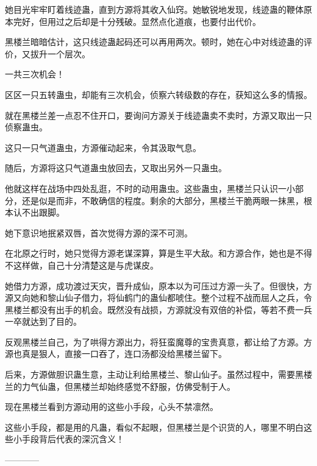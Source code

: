 \begin{this_body}
她目光牢牢盯着线迹蛊，直到方源将其收入仙窍。她敏锐地发现，线迹蛊的鞭体原本完好，但用过之后却是十分残破。显然点化道痕，也要付出代价。

黑楼兰暗暗估计，这只线迹蛊起码还可以再用两次。顿时，她在心中对线迹蛊的评价，又拔升一个层次。

一共三次机会！

区区一只五转蛊虫，却能有三次机会，侦察六转级数的存在，获知这么多的情报。

就在黑楼兰差一点忍不住开口，要询问方源关于线迹蛊卖不卖时，方源又取出一只侦察蛊虫。

这只一只气道蛊虫，方源催动起来，令其汲取气息。

随后，方源将这只气道蛊虫放回去，又取出另外一只蛊虫。

他就这样在战场中四处乱逛，不时的动用蛊虫。这些蛊虫，黑楼兰只认识一小部分，还是似是而非，不敢确信的程度。剩余的大部分，黑楼兰干脆两眼一抹黑，根本认不出跟脚。

她下意识地抿紧双唇，首次觉得方源的深不可测。

在北原之行时，她只觉得方源老谋深算，算是生平大敌。和方源合作，她也是不得不这样做，自己十分清楚这是与虎谋皮。

她借力方源，成功渡过天灾，晋升成仙，原本以为可压过方源一头了。但很快，方源又向她和黎山仙子借力，将仙鹤门的蛊仙都唬住。整个过程不战而屈人之兵，令黑楼兰都没有出手的机会。既然没有战损，方源就没有双倍的补偿，等若不费一兵一卒就达到了目的。

反观黑楼兰自己，为了哄得方源出力，将狂蛮魔尊的宝贵真意，都让给了方源。方源也真是狠人，直接一口吞了，连口汤都没给黑楼兰留下。

后来，方源做胆识蛊生意，主动让利给黑楼兰、黎山仙子。虽然过程中，需要黑楼兰的力气仙蛊，但黑楼兰却始终感觉不舒服，仿佛受制于人。

现在黑楼兰看到方源动用的这些小手段，心头不禁凛然。

这些小手段，都是用的凡蛊，看似不起眼，但黑楼兰是个识货的人，哪里不明白这些小手段背后代表的深沉含义！

------------

\end{this_body}

